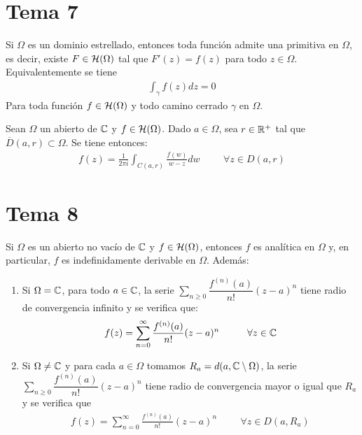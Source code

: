 \documentclass[12pt]{article}
\begin{document}
    \section{Tema 7}

    \begin{teo}
        Si $\Omega$ es un dominio estrellado, entonces toda función admite una primitiva en $\Omega$, es decir, existe $F\in \mathcal{H}(\Omega)$ tal que $F'(z) = f(z)$ para todo $z\in \Omega$. Equivalentemente se tiene
        \begin{gather*}
            \int_\gamma f(z) dz = 0
        \end{gather*}
        Para toda función $f\in \mathcal{H}(\Omega)$ y todo camino cerrado $\gamma$ en $\Omega$.
    \end{teo}

    \begin{prop}
        Sean $\Omega$ un abierto de $\mathbb{C}$ y $f\in \mathcal{H}(\Omega)$. Dado $a\in \Omega$, sea $r\in \mathbb{R}^+$ tal que $\overline{D}(a,r)\subset \Omega$. Se tiene entonces:
        \begin{gather*}
            f(z) = \frac{1}{2\pi i } \int_{C(a,r)} \frac{f(w)}{w-z} dw \hspace{1cm} \forall z \in D(a,r)
        \end{gather*}
    \end{prop}

    \section{Tema 8}
    \begin{teo}
        Si $\Omega$ es un abierto no vacío de $\mathbb{C}$ y $f\in \mathcal{H}(\Omega)$, entonces $f$ es analítica en $\Omega$ y, en particular, $f$ es indefinidamente derivable en $\Omega$. Además:
        \begin{enumerate}
            \item Si $\Omega = \mathbb{C}$, para todo $a\in \mathbb{C}$, la serie $\sum\limits_{n\geq 0} \dfrac{f^{(n)}(a)}{n!}(z-a)^n$ tiene radio de convergencia infinito y se verifica que:
            \begin{gather*}
                f(z) = \sum\limits_{n=0}^\infty \frac{f^{(n)}(a)}{n!} (z-a)^n \hspace{1cm} \forall z \in \mathbb{C}
            \end{gather*}
            \item Si $\Omega \neq \mathbb{C}$ y para cada $a\in \Omega$ tomamos $R_a = d(a,\mathbb{C}\setminus \Omega)$, la serie $\sum\limits_{n\geq 0} \dfrac{f^{(n)}(a)}{n!}(z-a)^n$ tiene radio de convergencia mayor o igual que $R_a$ y se verifica que 
            \begin{gather*}
                f(z) = \sum\limits_{n=0}^\infty \frac{f^{(n)}(a)}{n!} (z-a)^n \hspace{1cm} \forall z \in D(a, R_a)
            \end{gather*}
        \end{enumerate}
    \end{teo}
\end{document}
